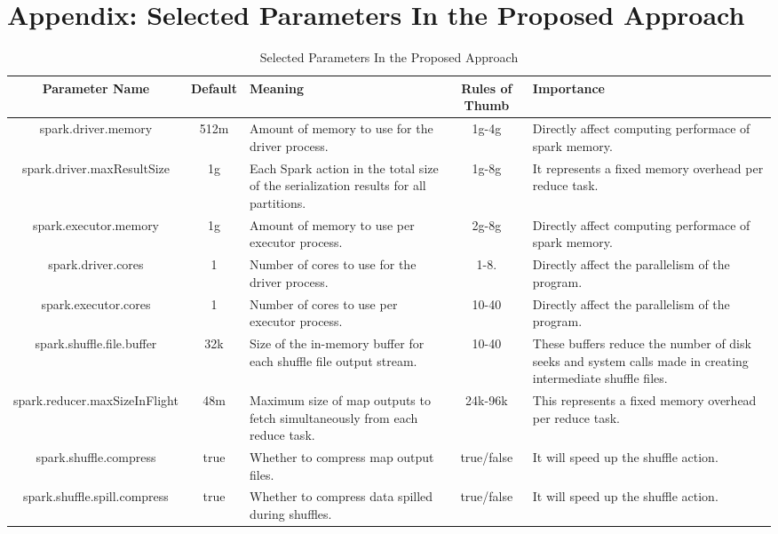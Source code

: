 \section{Appendix: Selected Parameters In the Proposed Approach}

\begin{table*}[!htbp]
\caption{Selected Parameters In the Proposed Approach} \label{tab:parameters} 
\begin{center}
    \begin{tabular}{ | c | c  | p{4cm} | c | p{5cm} |}
    \hline
    Parameter Name & Default & Meaning & Rules of Thumb & Importance\\ 
    \hline
    spark.driver.memory & 512m & Amount of memory to use for the driver process. & 1g-4g & Directly affect computing performace of spark memory.\\ 
    \hline
    spark.driver.maxResultSize & 1g & Each Spark action in the total size of the serialization results for all partitions. & 1g-8g & It represents a fixed memory overhead per reduce task.\\ 
    \hline
    spark.executor.memory &  1g &Amount of memory to use per executor process.   & 2g-8g & Directly affect computing performace of spark memory.\\
    \hline
     spark.driver.cores & 1 & Number of cores to use for the driver process. & 1-8. & Directly affect the parallelism of the program.\\
    \hline
      spark.executor.cores &  1 & Number of cores to use  per executor process. & 10-40 & Directly affect the parallelism of the program.\\
    \hline
     spark.shuffle.file.buffer &  32k & Size of the in-memory buffer for each shuffle file output stream. & 10-40 & These buffers reduce the number of disk seeks and system calls made in creating intermediate shuffle files.\\
    \hline
     spark.reducer.maxSizeInFlight &  48m & Maximum size of map outputs to fetch simultaneously from each reduce task.  & 24k-96k & This represents a fixed memory overhead per reduce task. \\
    \hline
     spark.shuffle.compress &  true & Whether to compress map output files. & true/false & It will speed up the shuffle action.\\
    \hline
     spark.shuffle.spill.compress &  true & Whether to compress data spilled during shuffles. & true/false & It will speed up the shuffle action.\\
    \hline

\end{tabular}
\end{center}
\end{table*}
